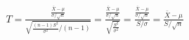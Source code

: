 \documentclass[preview]{standalone}
\begin{document}
\begin{align*}
T = \frac{\frac{\bar{X} - \mu}{\sigma / \sqrt{n}}}{\sqrt{\frac{(n-1)S^2}{\sigma^2} / (n-1)}}  = \frac{\frac{\bar{X} - \mu}{\sigma / \sqrt{n}}}{\sqrt{\frac{S^2}{\sigma^2}}}  = \frac{\frac{\bar{X} - \mu}{\sigma / \sqrt{n}}}{S / \sigma}  = \frac{\bar{X} - \mu}{S / \sqrt{n}}
\end{align*}
\end{document}

